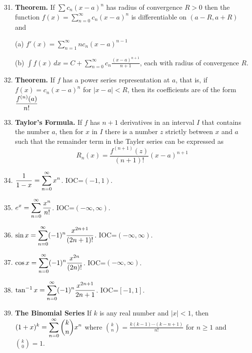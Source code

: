 {%
\begin{enumerate}
\setcounter{enumi}{30}
\item {\bf Theorem.} If $\sum c_n(x-a)^n$ has radius of convergence 
$R>0$ then the function $f(x)=\sum_{n=0}^{\infty}c_n(x-a)^n$ is 
differentiable on $(a-R,a+R)$ and

(a) $f'(x)=\sum_{n=1}^{\infty}nc_n(x-a)^{n-1}$

(b) $\int f(x)\, dx=C+\sum_{n=0}^{\infty}c_n\frac{(x-a)^{n+1}}{n+1}$,
each with radius of convergence $R$.
\end{enumerate}

\begin{enumerate}
\setcounter{enumi}{31}
\item {\bf Theorem.} If $f$ has a power series representation at $a$,
that is, if $f(x)=c_n(x-a)^n$ for $|x-a|<R$, then its coefficients are
of the form $\displaystyle{\frac{f^{(n)}(a)}{n!}}$

\item {\bf Taylor's Formula.} If $f$ has $n+1$ derivatives in an
interval $I$ that contains the number $a$, then for $x$ in $I$ there
is a number $z$ strictly between $x$ and $a$ such that the remainder
term in the Tayler series can be expressed as
\[ R_n(x)=\frac{f^{(n+1)}(z)}{(n+1)!}(x-a)^{n+1} \]

\item $\displaystyle{\frac{1}{1-x}=\sum_{n=0}^{\infty}x^n}$.  IOC=$(-1,1)$.

\item $\displaystyle{e^x=\sum_{n=0}^{\infty}\frac{x^n}{n!}}$.  IOC=$(-\infty,\infty)$.

\item $\displaystyle{\sin x=\sum_{n=0}^{\infty}(-1)^n\frac{x^{2n+1}}{(2n+1)!}}$.
IOC=$(-\infty,\infty)$.

\item $\displaystyle{\cos x=\sum_{n=0}^{\infty}(-1)^n\frac{x^{2n}}{(2n)!}}$.
IOC=$(-\infty,\infty)$.

\item $\displaystyle{\tan^{-1}x=\sum_{n=0}^{\infty}(-1)^n\frac{x^{2n+1}}
{2n+1}}$.  IOC=$[-1,1]$.
\end{enumerate}

\begin{enumerate}
\setcounter{enumi}{38}
\item {\bf The Binomial Series} If $k$ is any real number and $|x|<1$,
then $\displaystyle{(1+x)^k=\sum_{n=0}^{\infty}{k\choose n}x^n}$ where
${k\choose n}=\frac{k(k-1)\cdots(k-n+1)}{n!}$ for $n\geq 1$ and
${k\choose 0}=1$.
\end{enumerate}

}

